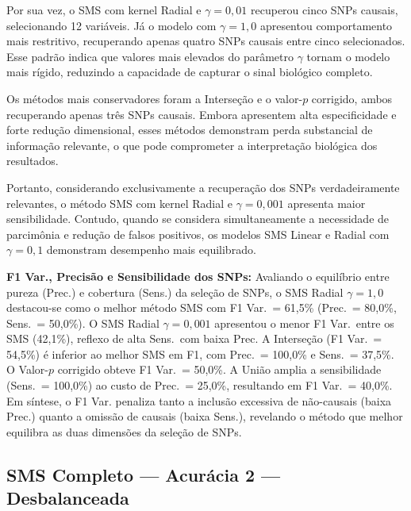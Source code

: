 \documentclass[12pt,a4paper]{article}
\newcommand{\novo}[1]{\textcolor{corNova}{#1}}
\begin{document}
Por sua vez, o SMS com kernel Radial e $\gamma = 0{,}01$ recuperou cinco SNPs causais, selecionando 12 variáveis. Já o modelo com $\gamma = 1{,}0$ apresentou comportamento mais restritivo, recuperando apenas quatro SNPs causais entre cinco selecionados. Esse padrão indica que valores mais elevados do parâmetro $\gamma$ tornam o modelo mais rígido, reduzindo a capacidade de capturar o sinal biológico completo.

Os métodos mais conservadores foram a Interseção e o valor-$p$ corrigido, ambos recuperando apenas três SNPs causais. Embora apresentem alta especificidade e forte redução dimensional, esses métodos demonstram perda substancial de informação relevante, o que pode comprometer a interpretação biológica dos resultados.

Portanto, considerando exclusivamente a recuperação dos SNPs verdadeiramente relevantes, o método SMS com kernel Radial e $\gamma = 0{,}001$ apresenta maior sensibilidade. Contudo, quando se considera simultaneamente a necessidade de parcimônia e redução de falsos positivos, os modelos SMS Linear e Radial com $\gamma = 0{,}1$ demonstram desempenho mais equilibrado.


\novo{\textbf{F1 Var., Precisão e Sensibilidade dos SNPs:} Avaliando o equilíbrio entre pureza (Prec.) e cobertura (Sens.) da seleção de SNPs, o SMS Radial $\gamma=1{,}0$ destacou-se como o melhor método SMS com F1 Var.\ = 61,5\% (Prec.\ = 80,0\%, Sens.\ = 50,0\%). O SMS Radial $\gamma=0{,}001$ apresentou o menor F1 Var.\ entre os SMS (42,1\%), reflexo de alta Sens.\ com baixa Prec. A Interseção (F1 Var.\ = 54,5\%) é inferior ao melhor SMS em F1, com Prec.\ = 100,0\% e Sens.\ = 37,5\%. O Valor-$p$ corrigido obteve F1 Var.\ = 50,0\%. A União amplia a sensibilidade (Sens.\ = 100,0\%) ao custo de Prec.\ = 25,0\%, resultando em F1 Var.\ = 40,0\%. Em síntese, o F1 Var. penaliza tanto a inclusão excessiva de não-causais (baixa Prec.) quanto a omissão de causais (baixa Sens.), revelando o método que melhor equilibra as duas dimensões da seleção de SNPs.}
\subsection{SMS Completo --- Acurácia 2 --- Desbalanceada}
\end{document}
